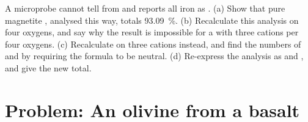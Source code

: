 \begin{exercise}[$\star\star\star$]\label{exo:b1:rock-forming-minerals:12}
A microprobe cannot tell  from  and reports all iron
as . (a) Show that pure magnetite , analysed this way,
totals \qty{93.09}{\percent}. (b) Recalculate this analysis on four oxygens,
and say why the result is impossible for a  with three cations per four
oxygens. (c) Recalculate on three cations instead, and find the numbers of
 and  by requiring the formula to be neutral.
(d) Re-express the analysis as  and , and give the new
total.
\end{exercise}

\section{Problem: An olivine from a basalt}

